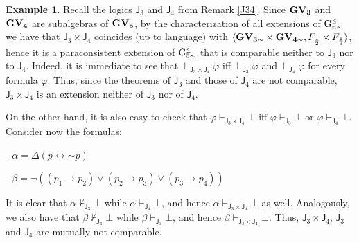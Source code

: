 \documentclass{article}
\theoremstyle{definition}
\newtheorem{example}{Example}
\newcommand{\ninv}{\mathord{\sim}}
\newcommand{\Gnsimleq}{\mathrm{G}\mystrut^{\text{\tiny $\leq$}}_{n\sim}}
\newcommand{\Gcsimleq}{\mathrm{G}\mystrut^{\text{\tiny $\leq$}}_{5\sim}}
\newcommand\mystrut{\rule{0pt}{7pt}}
\begin{document}
\begin{example}\label{exJ3xJ4}
Recall the logics $\mathsf{J}_3$ and $\mathsf{J}_4$ from Remark \ref{J34}.
Since $\bf GV_{3}$ and $\bf GV_{4}$ are subalgebras of $\bf GV_{5}$, by the characterization of all extensions of $\Gnsimleq$ we have that $\mathsf{J}_3\times \mathsf{J}_4$ coincides (up to language) with $\langle {\bf GV_{3 \sim}} \times {\bf GV_{4 \sim}}, F_{\frac{1}{2}}\times F_{\frac{1}{3}}\rangle$, hence it is a paraconsistent extension of $\Gcsimleq$ that is comparable neither to $\mathsf{J}_3$ nor to $\mathsf{J}_4$. Indeed, it is immediate to see that $\vdash_{\mathsf{J}_3\times \mathsf{J}_4}\varphi$ iff $\vdash_{\mathsf{J}_3}\varphi$ and $\vdash_{\mathsf{J}_4}\varphi$ for every formula $\varphi$. Thus, since the theorems of $\mathsf{J}_3$ and those of $\mathsf{J}_4$ are not comparable,  $\mathsf{J}_3\times \mathsf{J}_4$ is an extension neither of $\mathsf{J}_3$ nor of $\mathsf{J}_4$. 

On the other hand, it is also easy to check that $\varphi \vdash_{\mathsf{J}_3\times \mathsf{J}_4}\bot$ iff $\varphi \vdash_{\mathsf{J}_3}\bot$ or $\varphi \vdash_{\mathsf{J}_4}\bot$. Consider now the formulas:

- $\alpha = \Delta(p \leftrightarrow \ninv p)$

- $\beta = \neg((p_1 \to p_2) \lor (p_2 \to p_3) \lor (p_3 \to p_4))$

\noindent It is clear that $\alpha \not\vdash_{\mathsf{J}_3}\bot$ while  $\alpha \vdash_{\mathsf{J}_4}\bot$, and hence $\alpha \vdash_{\mathsf{J}_3\times \mathsf{J}_4}\bot$ as well. Analogously, we also have that $\beta \not\vdash_{\mathsf{J}_4}\bot$ while  $\beta \vdash_{\mathsf{J}_3}\bot$, and hence $\beta \vdash_{\mathsf{J}_3\times \mathsf{J}_4}\bot$. 
Thus, $\mathsf{J}_3\times \mathsf{J}_4$, $\mathsf{J}_3$ and $\mathsf{J}_4$ are mutually not comparable.
\end{example}
\end{document}
